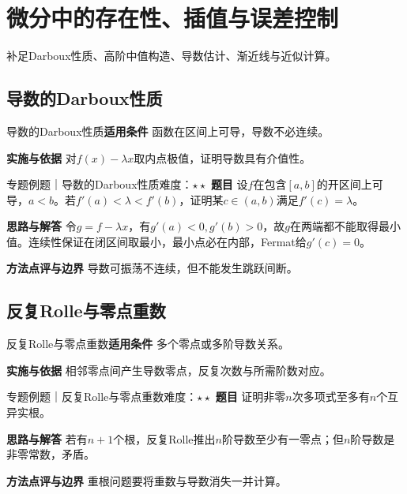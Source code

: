 \section{微分中的存在性、插值与误差控制}\label{mat:differentiation}
\begin{examtip}补足Darboux性质、高阶中值构造、导数估计、渐近线与近似计算。\end{examtip}
\subsection{导数的Darboux性质}\label{mat:differentiation:darboux}
\begin{method}{导数的Darboux性质}\textbf{适用条件} 函数在区间上可导，导数不必连续。\par\textbf{实施与依据} 对$f(x)-\lambda x$取内点极值，证明导数具有介值性。\end{method}
\begin{example}{专题例题｜导数的Darboux性质}{难度：$\star\star$}
\textbf{题目} 设$f$在包含$[a,b]$的开区间上可导，$a<b$。若$f\prime(a)<\lambda<f\prime(b)$，证明某$c\in(a,b)$满足$f\prime(c)=\lambda$。\par\textbf{思路与解答} 令$g=f-\lambda x$，有$g\prime(a)<0,g\prime(b)>0$，故$g$在两端都不能取得最小值。连续性保证在闭区间取最小，最小点必在内部，Fermat给$g\prime(c)=0$。\par\textbf{方法点评与边界} 导数可振荡不连续，但不能发生跳跃间断。
\end{example}
\subsection{反复Rolle与零点重数}\label{mat:differentiation:rolle}
\begin{method}{反复Rolle与零点重数}\textbf{适用条件} 多个零点或多阶导数关系。\par\textbf{实施与依据} 相邻零点间产生导数零点，反复次数与所需阶数对应。\end{method}
\begin{example}{专题例题｜反复Rolle与零点重数}{难度：$\star\star$}
\textbf{题目} 证明非零$n$次多项式至多有$n$个互异实根。\par\textbf{思路与解答} 若有$n+1$个根，反复Rolle推出$n$阶导数至少有一零点；但$n$阶导数是非零常数，矛盾。\par\textbf{方法点评与边界} 重根问题要将重数与导数消失一并计算。
\end{example}
